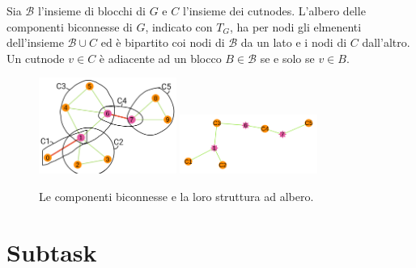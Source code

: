 Sia $\mathcal{B}$ l'insieme di blocchi di $G$ e $C$ l'insieme dei cutnodes.
L'albero delle componenti biconnesse di $G$, indicato con $T_G$, ha per nodi gli elmenenti dell'insieme $\mathcal{B}\cup C$ ed è bipartito coi nodi di $\mathcal{B}$ da un lato e i nodi di $C$ dall'altro. Un cutnode $v\in C$ è adiacente ad un blocco $B\in \mathcal{B}$ se e solo se $v\in B$.  


\begin{figure}[h!]
\begin{center}
  \noindent \includegraphics[width=0.40\textwidth]{figures/biconnected_components.png} \hfill \includegraphics[width=0.40\textwidth]{figures/biconnected_components_tree.png}
\end{center}
\caption{Le componenti biconnesse e la loro struttura ad albero.}
\end{figure}



\section*{Subtask}


